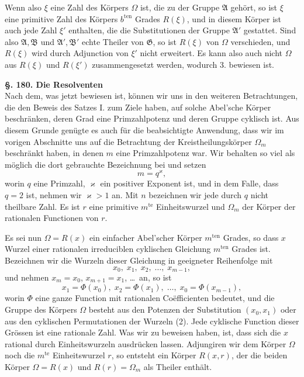 \documentclass[12pt,a4paper]{article}
\begin{document}
Wenn also $\xi$ eine Zahl des Körpers $\Omega$ ist, die zu der Gruppe $\mathfrak{A}$ gehört, so ist $\xi$ eine primitive Zahl des Körpers $b^{\text{ten}}$ Grades $R(\xi)$, und in diesem Körper ist auch jede Zahl $\xi'$ enthalten, die die Substitutionen der Gruppe $\mathfrak{A}'$ gestattet. Sind also $\mathfrak{A}, \mathfrak{B}$ und $\mathfrak{A}', \mathfrak{B}'$ echte Theiler von $\mathfrak{G}$, so ist $R(\xi)$ von $\Omega$ verschieden, und $R(\xi)$ wird durch Adjunction von $\xi'$ nicht erweitert. Es kann also auch nicht $\Omega$ aus $R(\xi)$ und $R(\xi')$ zusammengesetzt werden, wodurch 3. bewiesen ist.

\bigskip\noindent\textbf{\S. 180. Die Resolventen}\\[4pt]

Nach dem, was jetzt bewiesen ist, können wir uns in den weiteren Betrachtungen, die den Beweis des Satzes I. zum Ziele haben, auf solche Abel'sche Körper beschränken, deren Grad eine Primzahlpotenz und deren Gruppe cyklisch ist. Aus diesem Grunde genügte es auch für die beabsichtigte Anwendung, dass wir im vorigen Abschnitte uns auf die Betrachtung der Kreistheilungskörper $\Omega_m$ beschränkt haben, in denen $m$ eine Primzahlpotenz war. Wir behalten so viel als möglich die dort gebrauchte Bezeichnung bei und setzen
\begin{equation}\label{eq:180-1}
m = q^\varkappa,
\end{equation}
worin $q$ eine Primzahl, $\varkappa$ ein positiver Exponent ist, und in dem Falle, dass $q = 2$ ist, nehmen wir $\varkappa > 1$ an. Mit $n$ bezeichnen wir jede durch $q$ nicht theilbare Zahl. Es ist $r$ eine primitive $m^{\text{te}}$ Einheitswurzel und $\Omega_m$ der Körper der rationalen Functionen von $r$.

Es sei nun $\Omega = R(x)$ ein einfacher Abel'scher Körper $m^{\text{ten}}$ Grades, so dass $x$ Wurzel einer rationalen irreduciblen cyklischen Gleichung $m^{\text{ten}}$ Grades ist. Bezeichnen wir die Wurzeln dieser Gleichung in geeigneter Reihenfolge mit
\begin{equation}\label{eq:180-2}
x_0,\; x_1,\; x_2,\; \ldots,\; x_{m-1},
\end{equation}
und nehmen $x_m = x_0$, $x_{m+1} = x_1$, \ldots\ an, so ist
\[
x_1 = \Phi(x_0),\; x_2 = \Phi(x_1),\; \ldots,\; x_0 = \Phi(x_{m-1}),
\]
worin $\Phi$ eine ganze Function mit rationalen Coëfficienten bedeutet, und die Gruppe des Körpers $\Omega$ besteht aus den Potenzen der Substitution $(x_0, x_1)$ oder aus den cyklischen Permutationen der Wurzeln (2). Jede cyklische Function dieser Grössen ist eine rationale Zahl. Was wir zu beweisen haben, ist, dass sich die $x$ rational durch Einheitswurzeln ausdrücken lassen. Adjungiren wir dem Körper $\Omega$ noch die $m^{\text{te}}$ Einheitswurzel $r$, so entsteht ein Körper $R(x, r)$, der die beiden Körper $\Omega = R(x)$ und $R(r) = \Omega_m$ als Theiler enthält.
\end{document}
